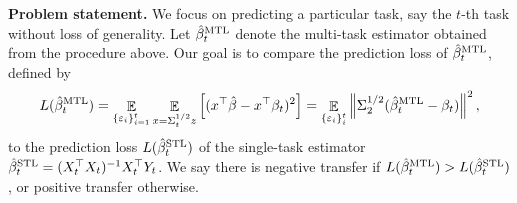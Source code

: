 





\textbf{Problem statement.}
We focus on predicting a particular task, say the $t$-th task without loss of generality.
Let $\hat{\beta}_t^{\text{MTL}}$ denote the multi-task estimator obtained from the procedure above.
Our goal is to compare the prediction loss of $\hat{\beta}_t^{\text{MTL}}$, defined by
{\small\begin{align*}
		L(\hat{\beta}_t^{\text{MTL}}) = \mathop{\mathbb{E}}_{\{\varepsilon_i\}_{i=1}^t} \mathop{\mathbb{E}}_{x = \Sigma_t^{1/2} z}\left[ ({x}^{\top}\hat{\beta} - {x}^{\top}\beta_t)^2 \right]
		= \mathop{\mathbb{E}}_{\{\varepsilon_i\}_i^t} \left\| \Sigma_2^{1/2} (\hat{\beta}_t^{\text{MTL}} - \beta_t) \right\|^2,
	\end{align*}}%
to the prediction loss $L(\hat{\beta}_t^{\text{STL}})$ of the single-task estimator $\hat{\beta}_t^{\text{STL}} = (X_t^{\top}X_t)^{-1}X_t^{\top}{Y_t}$.
We say there is negative transfer if  $L(\hat{\beta}_t^{\text{MTL}}) > L(\hat{\beta}_t^{\text{STL}})$, or positive transfer otherwise.

